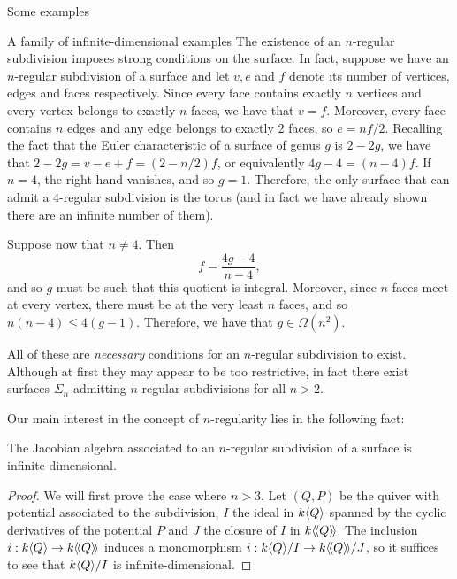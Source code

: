 \begin{chapter}{Some examples}
\begin{section}{A family of infinite-dimensional examples}
The existence of an $n$-regular subdivision imposes strong conditions on the surface. In fact, suppose we have an $n$-regular subdivision of a surface and let $v, e$ and $f$ denote its number of vertices, edges and faces respectively. Since every face contains exactly $n$ vertices and every vertex belongs to exactly $n$ faces, we have that $v=f$. Moreover, every face contains $n$ edges and any edge belongs to exactly 2 faces, so $e=nf/2$.
Recalling the fact that the Euler characteristic of a surface of genus $g$ is $2-2g$, we have that $2-2g=v-e+f=(2-n/2)f$, or equivalently $4g-4 = (n-4)f$. If $n=4$, the right hand vanishes, and so $g=1$. Therefore, the only surface that can admit a $4$-regular subdivision is the torus (and in fact we have already shown there are an infinite number of them).

Suppose now that $n\neq 4$. Then
\begin{equation}
\label{euler-regular}f=\frac{4g-4}{n-4},
\end{equation}and so $g$ must be such that this quotient is integral. Moreover, since $n$ faces meet at every vertex, there must be at the very least $n$ faces, and so $n(n-4)\leq 4(g-1)$. Therefore, we have that $g\in \Omega(n^2)$.

All of these are \emph{necessary} conditions for an $n$-regular subdivision to exist. Although at first they may appear to be too restrictive, in fact there exist surfaces $\Sigma_n$ admitting $n$-regular subdivisions for all $n>2$. \note{\textcolor{red}{completar esto cuando lo tengamos, si es que es cierto :)}}

Our main interest in the concept of $n$-regularity lies in the following fact:

\begin{thm} The Jacobian algebra associated to an $n$-regular subdivision of a surface is infinite-dimensional.
\end{thm}
\begin{proof} We will first prove the case where $n>3$. Let $(Q,P)$ be the quiver with potential associated to the subdivision, $I$ the ideal in $k\langle Q\rangle$ spanned by the cyclic derivatives of the potential $P$ and $J$ the closure of $I$ in $k\langle\!\langle Q\rangle\!\rangle$. The inclusion $i:k\langle Q\rangle\to k\langle\!\langle Q\rangle\!\rangle$ induces a monomorphism $i:k\langle Q\rangle/I \to k\langle\!\langle Q\rangle\!\rangle/J$, so it suffices to see that $k\langle Q\rangle/I$ is infinite-dimensional. 


\end{proof}
\end{section}
\end{chapter}

